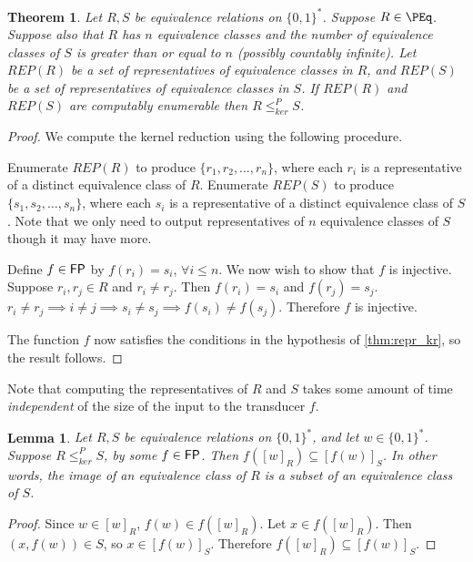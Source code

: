 \documentclass{article}
\newtheorem{theorem}{Theorem}[section]
\newtheorem{lemma}[lemma]{Lemma}
\theoremstyle{definition} \newtheorem{definition}[definition]{Definition}
\newcommand{\sigmastar}{\{0, 1\}^{*}} %
\newcommand{\kr}{\leq^{P}_{ker}} %
\begin{document}
\begin{theorem}\label{thm:reps}
  Let $R,S$ be equivalence relations on $\sigmastar$. Suppose
  $R\in\PEq$. Suppose also that $R$ has $n$ equivalence classes and the number
  of equivalence classes of $S$ is greater than or equal to $n$ (possibly
  countably infinite). Let $REP(R)$ be a set of representatives of equivalence
  classes in $R$, and $REP(S)$ be a set of representatives of equivalence
  classes in $S$. If $REP(R)$ and $REP(S)$ are computably enumerable then $R\kr
  S$.
\end{theorem}
\begin{proof}
  We compute the kernel reduction using the following procedure.

  Enumerate $REP(R)$ to produce $\{r_1, r_2, \ldots, r_n\}$, where each $r_i$
  is a representative of a distinct equivalence class of $R$. Enumerate
  $REP(S)$ to produce $\{s_1, s_2, \ldots, s_n\}$, where each $s_i$ is a
  representative of a distinct equivalence class of $S$. Note that we only need
  to output representatives of $n$ equivalence classes of $S$ though it may
  have more.

  Define $f\in{\ensuremath{\mathsf{FP}}}$ by $f(r_i)=s_i$, $\forall i\leq n$. We now wish to show that
  $f$ is injective. Suppose $r_i,r_j\in R$ and $r_i\neq r_j$. Then $f(r_i)=s_i$
  and $f(r_j)=s_j$. $r_i\neq r_j\implies i\neq j\implies s_i\neq s_j\implies
  f(s_i)\neq f(s_j)$. Therefore $f$ is injective.

  The function $f$ now satisfies the conditions in the hypothesis of
  \autoref{thm:repr_kr}, so the result follows.
\end{proof}

Note that computing the representatives of $R$ and $S$ takes some amount of
time \emph{independent} of the size of the input to the transducer $f$.

\begin{lemma}\label{lem:image}
  Let $R,S$ be equivalence relations on $\sigmastar$, and let
  $w\in\sigmastar$. Suppose $R\kr S$, by some $f\in{\ensuremath{\mathsf{FP}}}$. Then
  $f([w]_R)\subseteq [f(w)]_S$. In other words, the image of an equivalence
  class of $R$ is a subset of an equivalence class of $S$.
\end{lemma}
\begin{proof}
  Since $w\in [w]_R$, $f(w)\in f([w]_R)$. Let $x\in f([w]_R)$. Then $(x,
  f(w))\in S$, so $x\in [f(w)]_S$. Therefore $f([w]_R)\subseteq [f(w)]_S$.
\end{proof}
\end{document}
